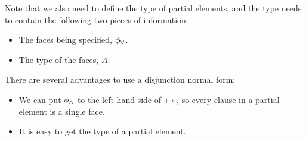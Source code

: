 Note that we also need to define the type of partial elements,
and the type needs to contain the following two pieces of information:
\begin{itemize}
\item The faces being specified, $\phi_\lor$.
\item The type of the faces, $A$.
\end{itemize}
There are several advantages to use a disjunction normal form:
\begin{itemize}
\item We can put $\phi_\land$ to the left-hand-side of $\mapsto$,
so every clause in a partial element is a single face.
\item It is easy to get the type of a partial element.
\end{itemize}
